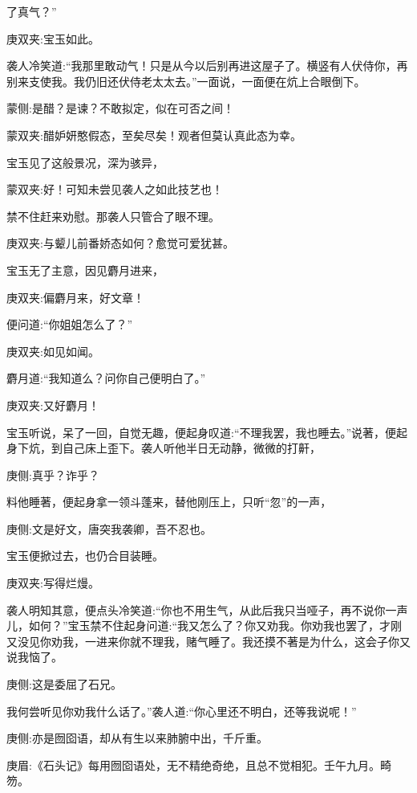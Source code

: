 \begin{parag}
了真气？”\begin{note}庚双夹:宝玉如此。\end{note}袭人冷笑道:“我那里敢动气！只是从今以后别再进这屋子了。横竖有人伏侍你，再别来支使我。我仍旧还伏侍老太太去。”一面说，一面便在炕上合眼倒下。\begin{note}蒙侧:是醋？是谏？不敢拟定，似在可否之间！\end{note}\begin{note}蒙双夹:醋妒妍憨假态，至矣尽矣！观者但莫认真此态为幸。\end{note}宝玉见了这般景况，深为骇异，\begin{note}蒙双夹:好！可知未尝见袭人之如此技艺也！\end{note}禁不住赶来劝慰。那袭人只管合了眼不理。\begin{note}庚双夹:与颦儿前番娇态如何？愈觉可爱犹甚。\end{note}宝玉无了主意，因见麝月进来，\begin{note}庚双夹:偏麝月来，好文章！\end{note}便问道:“你姐姐怎么了？”\begin{note}庚双夹:如见如闻。\end{note}麝月道:“我知道么？问你自己便明白了。”\begin{note}庚双夹:又好麝月！\end{note}宝玉听说，呆了一回，自觉无趣，便起身叹道:“不理我罢，我也睡去。”说著，便起身下炕，到自己床上歪下。袭人听他半日无动静，微微的打鼾，\begin{note}庚侧:真乎？诈乎？\end{note}料他睡著，便起身拿一领斗蓬来，替他刚压上，只听“忽”的一声，\begin{note}庚侧:文是好文，唐突我袭卿，吾不忍也。\end{note}宝玉便掀过去，也仍合目装睡。\begin{note}庚双夹:写得烂熳。\end{note}袭人明知其意，便点头冷笑道:“你也不用生气，从此后我只当哑子，再不说你一声儿，如何？”宝玉禁不住起身问道:“我又怎么了？你又劝我。你劝我也罢了，才刚又没见你劝我，一进来你就不理我，赌气睡了。我还摸不著是为什么，这会子你又说我恼了。\begin{note}庚侧:这是委屈了石兄。\end{note}我何尝听见你劝我什么话了。”袭人道:“你心里还不明白，还等我说呢！”\begin{note}庚侧:亦是囫囵语，却从有生以来肺腑中出，千斤重。\end{note}\begin{note}庚眉:《石头记》每用囫囵语处，无不精绝奇绝，且总不觉相犯。壬午九月。畸笏。\end{note}
\end{parag}


